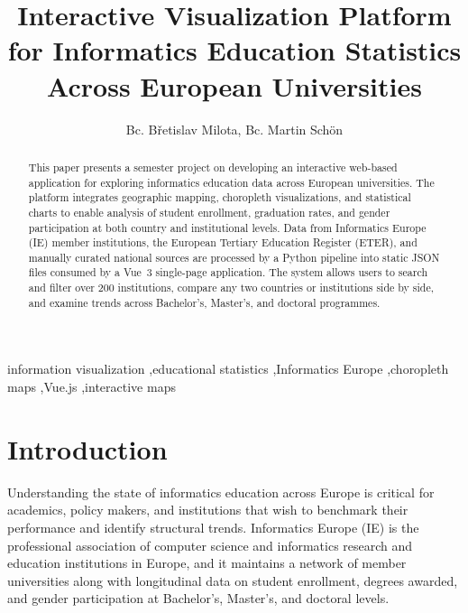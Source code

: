 \documentclass[final,3p,times,twocolumn]{elsarticle}
\begin{document}
\begin{frontmatter}

\title{Interactive Visualization Platform for Informatics Education Statistics Across European Universities}

\author{Bc. Břetislav Milota, Bc. Martin Schön}

\address{Department of Computer Science and Engineering, Faculty of Applied Sciences, University of West Bohemia, Plze\v{n}, Czech Republic}

\begin{abstract}
This paper presents a semester project on developing an interactive web-based application for exploring informatics education data across European universities. The platform integrates geographic mapping, choropleth visualizations, and statistical charts to enable analysis of student enrollment, graduation rates, and gender participation at both country and institutional levels. 
Data from Informatics Europe (IE) member institutions, the European Tertiary Education Register (ETER), and manually curated national sources are processed by a Python pipeline into static JSON files consumed by a Vue~3 single-page application. The system allows users to search and filter over 200 institutions, compare any two countries or institutions side by side, and examine trends across Bachelor's, Master's, and doctoral programmes.
\end{abstract}

\begin{keyword}
information visualization \sep educational statistics \sep Informatics Europe \sep choropleth maps \sep Vue.js \sep interactive maps
\end{keyword}

\end{frontmatter}


\section{Introduction}

Understanding the state of informatics education across Europe is critical for academics, policy makers, and institutions that wish to benchmark their performance and identify structural trends. Informatics Europe (IE) is the professional association of computer science and informatics research and education institutions in Europe, and it maintains a network of member universities along with longitudinal data on student enrollment, degrees awarded, and gender participation at Bachelor's, Master's, and doctoral levels.
\end{document}
